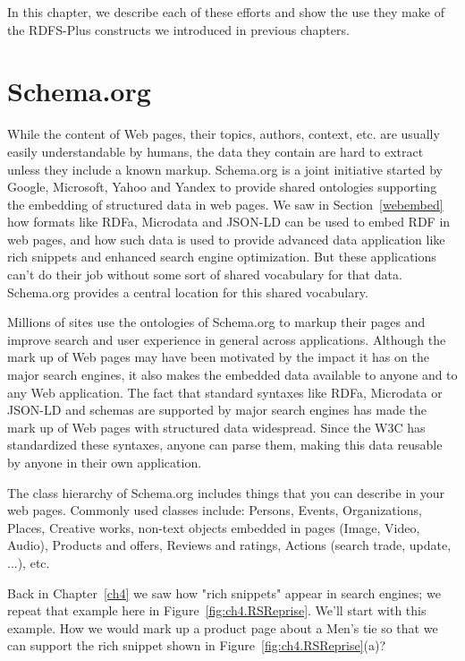 In this chapter, we describe each of these efforts and show the use they
make of the RDFS-Plus constructs we introduced in previous chapters.

\section{Schema.org}
\label{schema.org}
While the content of Web pages, their topics, authors, context, etc. are usually easily 
understandable by humans, the data they contain are hard to extract unless they include a 
known markup. Schema.org is a joint initiative started by Google, Microsoft, Yahoo and 
Yandex to provide shared ontologies supporting the embedding of structured data in web 
pages. We saw in Section~\ref{webembed} how formats like RDFa, Microdata and JSON-LD can 
be used to embed RDF in web pages, and how such data is used to provide
advanced data application like rich snippets and enhanced search engine optimization. 
But these applications can't do their job without some sort of shared vocabulary 
for that data.  Schema.org provides a central location for this shared vocabulary. 

Millions of sites use the ontologies of Schema.org to markup their pages and improve search and user experience 
in general across applications. Although the mark up of Web pages may have been motivated by the impact it 
has on the major search engines, it also makes the embedded data available to anyone and to any Web application. 
The fact that standard syntaxes like RDFa, Microdata or JSON-LD and schemas are supported by major search 
engines has made the mark up of Web pages with structured data  widespread.  Since the W3C has standardized these
syntaxes, anyone can parse them, making this data reusable by anyone in their own application. 


The class hierarchy of Schema.org includes things that you can describe in 
your web pages. 
Commonly used classes include: Persons, Events, Organizations, Places, Creative works, non-text objects 
embedded in pages (Image, Video, Audio), Products and offers, Reviews and ratings, Actions (search trade, update, ...), etc.

Back in Chapter~\ref{ch4} we saw how "rich snippets" appear in search engines; we repeat that example here in 
Figure~\ref{fig:ch4.RSReprise}. We'll start with this example.  How we would mark up a product page about 
a Men's tie so that we can support the rich snippet shown in Figure~\ref{fig:ch4.RSReprise}(a)?

